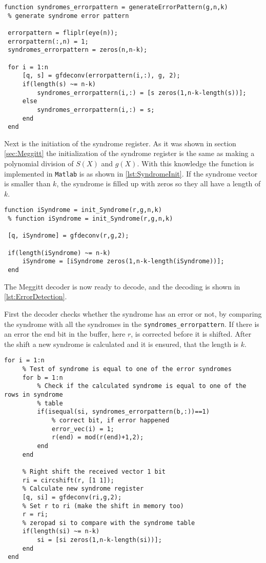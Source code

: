 \documentclass[Main]{subfiles}
\begin{document}
\begin{lstlisting}[caption=Error Pattern Creation, style=Code-Matlab, label=lst:ErrorPatternCreate]
 function syndromes_errorpattern = generateErrorPattern(g,n,k)
 % generate syndrome error pattern
 
 errorpattern = fliplr(eye(n));
 errorpattern(:,n) = 1;
 syndromes_errorpattern = zeros(n,n-k);
 
 for i = 1:n
     [q, s] = gfdeconv(errorpattern(i,:), g, 2);
     if(length(s) ~= n-k)
         syndromes_errorpattern(i,:) = [s zeros(1,n-k-length(s))];
     else
         syndromes_errorpattern(i,:) = s;
     end
 end
\end{lstlisting}

Next is the initiation of the syndrome register.
As it was shown in section \ref{sec:Meggitt} the initialization of the syndrome register is the same as making a polynomial division of $S(X)$ and $g(X)$. With this knowledge the function is implemented in \texttt{Matlab} is as shown in \codeTitle \ref{lst:SyndromeInit}.
If the syndrome vector is smaller than $k$, the syndrome is filled up with zeros so they all have a length of $k$.

\begin{lstlisting}[caption=Syndrome Initialization, style=Code-Matlab, label=lst:SyndromeInit]
 function iSyndrome = init_Syndrome(r,g,n,k)
 % function iSyndrome = init_Syndrome(r,g,n,k)
 
 [q, iSyndrome] = gfdeconv(r,g,2);
 
 if(length(iSyndrome) ~= n-k)
     iSyndrome = [iSyndrome zeros(1,n-k-length(iSyndrome))];
 end
\end{lstlisting}

The Meggitt decoder is now ready to decode, and the decoding is shown in \codeTitle \ref{lst:ErrorDetection}.

First the decoder checks whether the syndrome has an error or not, by comparing the syndrome with all the syndromes in the \texttt{syndromes\_errorpattern}.
If there is an error the end bit in the buffer, here $r$, is corrected before it is shifted.
After the shift a new syndrome is calculated and it is ensured, that the length is $k$.

\begin{lstlisting}[caption=Error Detection, style=Code-Matlab, label=lst:ErrorDetection]
 for i = 1:n
     % Test of syndrome is equal to one of the error syndromes
     for b = 1:n
         % Check if the calculated syndrome is equal to one of the rows in syndrome
         % table
         if(isequal(si, syndromes_errorpattern(b,:))==1)
             % correct bit, if error happened
             error_vec(i) = 1;
             r(end) = mod(r(end)+1,2);
         end
     end
     
     % Right shift the received vector 1 bit
     ri = circshift(r, [1 1]);
     % Calculate new syndrome register
     [q, si] = gfdeconv(ri,g,2);
     % Set r to ri (make the shift in memory too)
     r = ri;
     % zeropad si to compare with the syndrome table
     if(length(si) ~= n-k)
         si = [si zeros(1,n-k-length(si))];
     end
 end
\end{lstlisting}
\end{document}
